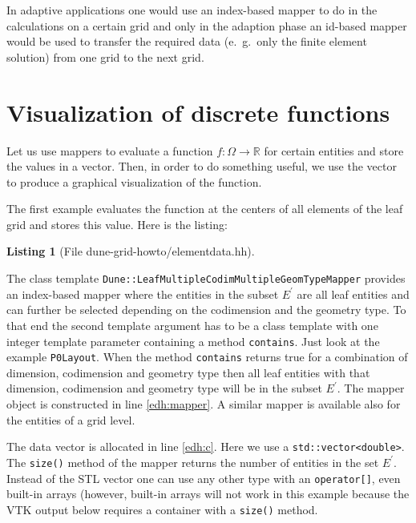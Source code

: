 \documentclass[11pt,a4paper,headinclude,footinclude,DIV16,normalheadings]{scrreprt}
\newtheorem{lst}{Listing}
\begin{document}
In adaptive applications one would use an index-based mapper to do in
the calculations on a certain grid and only in the adaption phase an
id-based mapper would be used to transfer the required data
(e.~g.~only the finite element solution) from one grid to the next grid.

\section{Visualization of discrete functions}

Let us use mappers to evaluate a function $f:\Omega\to\mathbb{R}$ for
certain entities and store the values in a vector. Then, in order to
do something useful, we use the vector to produce a graphical
visualization of the function.

The first example evaluates the function at the centers of all
elements of the leaf grid and stores this value. Here is the listing:

\begin{lst}[File dune-grid-howto/elementdata.hh] \mbox{}
\nopagebreak

\end{lst}

The class template
\lstinline!Dune::LeafMultipleCodimMultipleGeomTypeMapper!  provides an
index-based mapper where the entities in the subset $E^\prime$ are all
leaf entities and can further be selected depending on the codimension
and the geometry type. To that end the second template argument has to
be a class template with one integer template parameter containing a
method \lstinline!contains!. Just look at the example
\lstinline!P0Layout!. When the method \lstinline!contains!  returns
true for a combination of dimension, codimension and geometry type
then all leaf entities with that dimension, codimension and geometry
type will be in the subset $E^\prime$. The mapper object is
constructed in line \ref{edh:mapper}. A similar mapper is available
also for the entities of a grid level.

The data vector is allocated in line \ref{edh:c}. Here we use a
\lstinline!std::vector<double>!. The \lstinline!size()! method of the
mapper returns the number of entities in the set $E^\prime$. Instead
of the STL vector one can use any other type with an
\lstinline!operator[]!, even built-in arrays (however, built-in arrays
will not work in this example because the VTK output
below requires a container with a
\lstinline!size()! method. 
\end{document}
